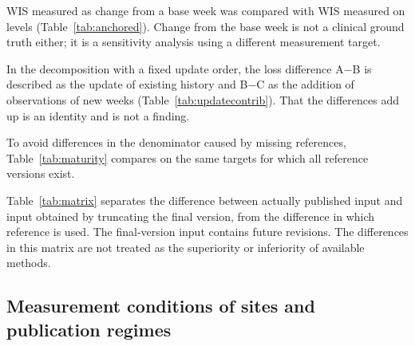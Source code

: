 \documentclass[11pt]{article}
\newcommand{\gentable}[1]{\adjustbox{max width=\linewidth}{}}
\begin{document}
WIS measured as change from a base week was compared with WIS measured on levels (Table~\ref{tab:anchored}). Change from the base week is not a clinical ground truth either; it is a sensitivity analysis using a different measurement target.

\begin{table}[H]\centering\small
\caption{WIS on levels (``WIS'') and on changes from a common base week (``anchored WIS''), one-week-earlier input relative to the latest fixed three-method ensemble.}\label{tab:anchored}
\gentable{tab_anchored}
\end{table}

In the decomposition with a fixed update order, the loss difference A$-$B is described as the update of existing history and B$-$C as the addition of observations of new weeks (Table~\ref{tab:updatecontrib}). That the differences add up is an identity and is not a finding.

\begin{table}[H]\centering\small
\caption{Decomposition of the WIS reduction into the revision of existing history and the addition of new observation weeks.}\label{tab:updatecontrib}
\gentable{tab_update_contrib}
\end{table}

To avoid differences in the denominator caused by missing references, Table~\ref{tab:maturity} compares on the same targets for which all reference versions exist.

\begin{table}[H]\centering\small
\caption{WIS ratios by reference vintage on common targets (one-week-earlier input relative to the latest fixed three-method ensemble).}\label{tab:maturity}
\gentable{tab_maturity}
\end{table}

Table~\ref{tab:matrix} separates the difference between actually published input and input obtained by truncating the final version, from the difference in which reference is used. The final-version input contains future revisions. The differences in this matrix are not treated as the superiority or inferiority of available methods.

\begin{table}[H]\centering\small
\caption{Mean WIS by input history and reference (Chronos-Bolt with the latest input).}\label{tab:matrix}
\gentable{tab_input_reference_matrix}
\end{table}

\subsection{Measurement conditions of sites and publication regimes}\label{app:sites}
\end{document}
